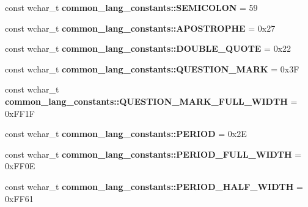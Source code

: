 \begin{DoxyCompactItemize}
\item 
\hypertarget{group___indexing_ga6f0f90eab6efe0fb5aded20a9e4b3949}{const wchar\-\_\-t {\bfseries common\-\_\-lang\-\_\-constants\-::\-S\-E\-M\-I\-C\-O\-L\-O\-N} = 59}\label{group___indexing_ga6f0f90eab6efe0fb5aded20a9e4b3949}

\item 
\hypertarget{group___indexing_ga95b4c8ef12a97998a10241c219b6a293}{const wchar\-\_\-t {\bfseries common\-\_\-lang\-\_\-constants\-::\-A\-P\-O\-S\-T\-R\-O\-P\-H\-E} = 0x27}\label{group___indexing_ga95b4c8ef12a97998a10241c219b6a293}

\item 
\hypertarget{group___indexing_ga437b32d2fe22094a09207d392499011d}{const wchar\-\_\-t {\bfseries common\-\_\-lang\-\_\-constants\-::\-D\-O\-U\-B\-L\-E\-\_\-\-Q\-U\-O\-T\-E} = 0x22}\label{group___indexing_ga437b32d2fe22094a09207d392499011d}

\item 
\hypertarget{group___indexing_ga5bab91c680bd568506a7c426025cc556}{const wchar\-\_\-t {\bfseries common\-\_\-lang\-\_\-constants\-::\-Q\-U\-E\-S\-T\-I\-O\-N\-\_\-\-M\-A\-R\-K} = 0x3\-F}\label{group___indexing_ga5bab91c680bd568506a7c426025cc556}

\item 
\hypertarget{group___indexing_gaaabf3f31fbd6eb42f3f5e6284e830289}{const wchar\-\_\-t {\bfseries common\-\_\-lang\-\_\-constants\-::\-Q\-U\-E\-S\-T\-I\-O\-N\-\_\-\-M\-A\-R\-K\-\_\-\-F\-U\-L\-L\-\_\-\-W\-I\-D\-T\-H} = 0x\-F\-F1\-F}\label{group___indexing_gaaabf3f31fbd6eb42f3f5e6284e830289}

\item 
\hypertarget{group___indexing_ga71e6ad9cc4cbe563b4ecd041584c84a5}{const wchar\-\_\-t {\bfseries common\-\_\-lang\-\_\-constants\-::\-P\-E\-R\-I\-O\-D} = 0x2\-E}\label{group___indexing_ga71e6ad9cc4cbe563b4ecd041584c84a5}

\item 
\hypertarget{group___indexing_ga6534dd837125dd3b296261f9685cc77a}{const wchar\-\_\-t {\bfseries common\-\_\-lang\-\_\-constants\-::\-P\-E\-R\-I\-O\-D\-\_\-\-F\-U\-L\-L\-\_\-\-W\-I\-D\-T\-H} = 0x\-F\-F0\-E}\label{group___indexing_ga6534dd837125dd3b296261f9685cc77a}

\item 
\hypertarget{group___indexing_ga7048c85dfb75ee97f315d7c59e7c2009}{const wchar\-\_\-t {\bfseries common\-\_\-lang\-\_\-constants\-::\-P\-E\-R\-I\-O\-D\-\_\-\-H\-A\-L\-F\-\_\-\-W\-I\-D\-T\-H} = 0x\-F\-F61}\label{group___indexing_ga7048c85dfb75ee97f315d7c59e7c2009}


\end{DoxyCompactItemize}
